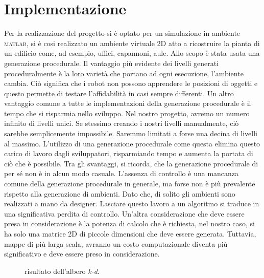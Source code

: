 \section{Implementazione}

Per la realizzazione del progetto si è optato per un simulazione in ambiente \textsc{matlab}, si è cosi realizzato un ambiente virtuale 2D atto a ricostruire la pianta di un edificio come, ad esempio, uffici, capannoni, aule. Allo scopo è stata usata una generazione procedurale.
Il vantaggio più evidente dei livelli generati proceduralmente è la loro varietà che portano ad ogni esecuzione, l'ambiente cambia. Ciò significa che i robot non possono apprendere le posizioni di oggetti e questo permette di testare l'affidabilità in casi sempre differenti.
Un altro vantaggio comune a tutte le implementazioni della generazione procedurale è il tempo che si risparmia nello sviluppo. Nel nostro progetto, avremo un numero infinito di livelli unici. Se stessimo creando i nostri livelli manualmente, ciò sarebbe semplicemente impossibile. Saremmo limitati a forse una decina di livelli al massimo.
L'utilizzo di una generazione procedurale come questa elimina questo carico di lavoro dagli sviluppatori, risparmiando tempo e aumenta la portata di ciò che è possibile.
Tra gli svantaggi, si ricorda, che la generazione procedurale di per sé non è in alcun modo casuale. 
L'assenza di controllo è una mancanza comune della generazione procedurale in generale, ma forse non è più prevalente rispetto alla generazione di ambienti. Dato che, di solito gli ambienti sono realizzati a mano da designer. Lasciare questo lavoro a un algoritmo si traduce in una significativa perdita di controllo.
Un'altra considerazione che deve essere presa in considerazione è la potenza di calcolo che è richiesta, nel nostro caso, si ha solo una matrice 2D di piccole dimensioni che deve essere generata. Tuttavia, mappe di più larga scala, avranno un costo computazionale diventa più significativo e deve essere preso in considerazione.\cite{green2016procedural}

\begin{figure}[!htb]
\centering
    \resizebox{0.7\linewidth}{!}{}
\caption{risultato dell'albero \emph{k-d}.}
\label{fig:albero}
\end{figure}


